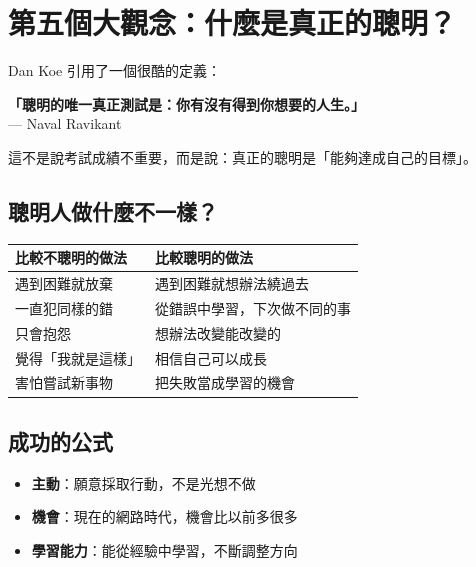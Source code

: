 \documentclass[12pt,a4paper]{article}
\begin{document}
\section{第五個大觀念：什麼是真正的聰明？}

Dan Koe 引用了一個很酷的定義：

\begin{importantbox}
\textbf{「聰明的唯一真正測試是：你有沒有得到你想要的人生。」}\\
\hfill — Naval Ravikant
\end{importantbox}

這不是說考試成績不重要，而是說：真正的聰明是「能夠達成自己的目標」。

\subsection{聰明人做什麼不一樣？}

\begin{longtable}{p{7cm}p{7cm}}
\toprule
\textbf{比較不聰明的做法} & \textbf{比較聰明的做法} \\
\midrule
\endfirsthead

\bottomrule
\endfoot

遇到困難就放棄 & 遇到困難就想辦法繞過去 \\
\midrule
一直犯同樣的錯 & 從錯誤中學習，下次做不同的事 \\
\midrule
只會抱怨 & 想辦法改變能改變的 \\
\midrule
覺得「我就是這樣」 & 相信自己可以成長 \\
\midrule
害怕嘗試新事物 & 把失敗當成學習的機會 \\
\bottomrule
\end{longtable}

\subsection{成功的公式}

\begin{center}
\end{center}

\begin{itemize}
    \item \textbf{主動}：願意採取行動，不是光想不做
    \item \textbf{機會}：現在的網路時代，機會比以前多很多
    \item \textbf{學習能力}：能從經驗中學習，不斷調整方向
\end{itemize}
\end{document}
